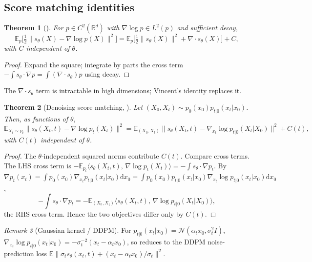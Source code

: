 \documentclass[11pt,letterpaper]{article}
\theoremstyle{plain}
\newtheorem{theorem}{Theorem}[section]
\theoremstyle{definition}
\theoremstyle{remark}
\newtheorem{remark}[theorem]{Remark}
\newcommand{\R}{\mathbb{R}}
\newcommand{\E}{\mathbb{E}}
\newcommand{\dd}{\mathrm{d}}
\newcommand{\calN}{\mathcal{N}}
\newcommand{\grad}{\nabla}
\newcommand{\divg}{\nabla\cdot}
\newcommand{\inner}[2]{\langle #1,\,#2\rangle}
\newcommand{\norm}[1]{\lVert #1\rVert}
\begin{document}
\subsection{Score matching identities}

\begin{theorem}[\citealt{hyvarinen2005scorematching}]\label{thm:hyvarinen}
For $p\in C^2(\R^d)$ with $\grad\log p\in L^2(p)$ and sufficient decay,
\begin{equation}
  \E_p\bigl[\tfrac12\norm{s_\theta(X)-\grad\log p(X)}^2\bigr]
  =\E_p\bigl[\tfrac12\norm{s_\theta(X)}^2+\divg s_\theta(X)\bigr]+C,
\end{equation}
with $C$ independent of $\theta$.
\end{theorem}
\begin{proof}
Expand the square; integrate by parts the cross term
$-\int s_\theta\cdot\grad p=\int(\divg s_\theta)p$ using decay.
\end{proof}

The $\divg s_\theta$ term is intractable in high dimensions; Vincent's
identity replaces it.

\begin{theorem}[Denoising score matching, \citealt{vincent2011connection}]
\label{thm:vincent}
Let $(X_0,X_t)\sim p_0(x_0)p_{t|0}(x_t|x_0)$. Then, as functions of $\theta$,
\begin{equation}
  \E_{X_t\sim p_t}\norm{s_\theta(X_t,t)-\grad\log p_t(X_t)}^2
  =\E_{(X_0,X_t)}\norm{s_\theta(X_t,t)-\grad_{x_t}\log p_{t|0}(X_t|X_0)}^2
  +C(t),
\end{equation}
with $C(t)$ independent of $\theta$.
\end{theorem}
\begin{proof}
The $\theta$-independent squared norms contribute $C(t)$. Compare cross
terms. The LHS cross term is
$-\E_{p_t}\inner{s_\theta(X_t,t)}{\grad\log p_t(X_t)}=-\int s_\theta\cdot\grad p_t$.
By
$\grad p_t(x_t)=\int p_0(x_0)\grad_{x_t}p_{t|0}(x_t|x_0)\dd x_0
=\int p_0(x_0)p_{t|0}(x_t|x_0)\grad_{x_t}\log p_{t|0}(x_t|x_0)\dd x_0$,
\[
  -\int s_\theta\cdot\grad p_t
  =-\E_{(X_0,X_t)}\inner{s_\theta(X_t,t)}{\grad\log p_{t|0}(X_t|X_0)},
\]
the RHS cross term. Hence the two objectives differ only by $C(t)$.
\end{proof}

\begin{remark}[Gaussian kernel / DDPM]\label{rem:gaussian-kernel}
For $p_{t|0}(x_t|x_0)=\calN(\alpha_t x_0,\sigma_t^2 I)$,
$\grad_{x_t}\log p_{t|0}(x_t|x_0)=-\sigma_t^{-2}(x_t-\alpha_t x_0)$,
so  reduces to the DDPM noise-prediction loss
$\E\norm{\sigma_t s_\theta(x_t,t)+(x_t-\alpha_t x_0)/\sigma_t}^2$.
\end{remark}
\end{document}
